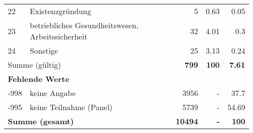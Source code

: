 \begin{longtable}{lXrrr}
        22 & \multicolumn{1}{X}{Existenzgründung} & %
          \num{5} &
          \num[round-mode=places,round-precision=2]{0,63} &
          \num[round-mode=places,round-precision=2]{0,05} \\

        23 & \multicolumn{1}{X}{betriebliches Gesundheitswesen, Arbeitssicherheit} & %
          \num{32} &
          \num[round-mode=places,round-precision=2]{4,01} &
          \num[round-mode=places,round-precision=2]{0,3} \\

        24 & \multicolumn{1}{X}{Sonstige} & %
          \num{25} &
          \num[round-mode=places,round-precision=2]{3,13} &
          \num[round-mode=places,round-precision=2]{0,24} \\

     \midrule
     \multicolumn{2}{l}{Summe (gültig)} &
       \textbf{\num{799}} &
     \textbf{100} &
       \textbf{\num[round-mode=places,round-precision=2]{7,61}} \\
     \multicolumn{5}{l}{\textbf{Fehlende Werte}}\\
       -998 &
       keine Angabe &
         \num{3956} &
        - &
         \num[round-mode=places,round-precision=2]{37,7} \\
       -995 &
       keine Teilnahme (Panel) &
         \num{5739} &
        - &
         \num[round-mode=places,round-precision=2]{54,69} \\
     \midrule
     \multicolumn{2}{l}{\textbf{Summe (gesamt)}} &
          \textbf{\num{10494}} &
        \textbf{-} &
        \textbf{100} \\
     \bottomrule
     \end{longtable}
     
